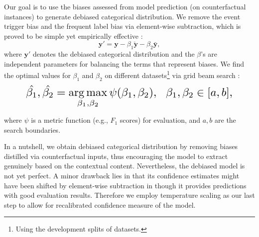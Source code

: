 \documentclass[11pt]{article}
\newcommand{\yb}{\mathbf{y}}
\begin{document}
Our goal is to use the biases assessed from model prediction (on counterfactual instances) to generate debiased categorical distribution. We remove the event trigger bias and the frequent label bias via element-wise subtraction, which is proved to be simple yet empirically effective \cite{qian-etal-2021-counterfactual}:
\vspace{-0.5em}
\begin{equation}
    \label{eqn:bias_mitigation}
    \yb' = \yb - \beta_1 \check{\yb} - \beta_2 \bar{\yb},
\end{equation}
where $\yb'$ denotes the debiased categorical distribution and the $\beta$'s are independent parameters for balancing the terms that represent biases.
We find the optimal values for $\beta_1$ and $\beta_2$ on different datasets\footnote{Using the development splits of datasets.} via grid beam search \cite{hokamp-liu-2017-lexically}:
\vspace{-0.25em}
\begin{equation}\label{eq:search}
\resizebox{0.89\hsize}{!}{
    $\hat{\beta_1}, \hat{\beta_2} = \mathop{\arg \max}\limits_{\beta_1, \beta_2}\psi(\beta_1, \beta_2), \ \ \beta_1, \beta_2 \in [a, b]$,
}
\end{equation}

\noindent
where $\psi$ is a metric function (e.g., $F_1$ scores) for evaluation, and $a, b$ are the search boundaries.

In a nutshell, we obtain debiased categorical distribution by removing biases distilled via counterfactual inputs, thus encouraging the model to extract genuinely based on the contextual content.
Nevertheless, the debiased model is not yet perfect.
A minor drawback lies in that its confidence estimates might have been shifted by element-wise subtraction in   though it provides predictions with good evaluation results.
Therefore we employ temperature scaling as our last step to allow for recalibrated confidence measure of the model.
\end{document}

